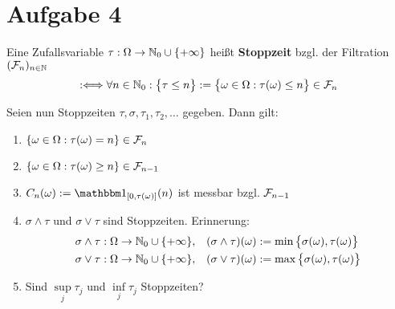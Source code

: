 \documentclass[12pt,a4paper]{article}
\begin{document}
\section*{Aufgabe 4}
\begin{defi}
Eine Zufallsvariable $\tau:\Omega\to\mathbb{N}_0\cup\lbrace+\infty\rbrace$ heißt \textbf{Stoppzeit} bzgl. der Filtration $(\mathcal{F}_n)_{n\in\mathbb{N}}$
\begin{align*}
:\Longleftrightarrow\forall n\in\mathbb{N}_0:\big\lbrace\tau\leq n\big\rbrace:=\big\lbrace \omega\in\Omega:\tau(\omega)\leq n\big\rbrace\in\mathcal{F}_n
\end{align*}
\end{defi}
Seien nun Stoppzeiten $\tau,\sigma,\tau_1,\tau_2,\ldots$ gegeben. Dann gilt:
\begin{enumerate}[label=\alph*)]
\item $\lbrace\omega\in\Omega:\tau(\omega)=n\rbrace\in\mathcal{F}_n$
\item $\lbrace\omega\in\Omega:\tau(\omega)\geq n\rbrace\in\mathcal{F}_{n-1}$
\item $\begin{aligned}
C_n(\omega):=\indi_{[0,\tau(\omega)]}(n)
\end{aligned}$ ist messbar bzgl. $\mathcal{F}_{n-1}$
\item $\sigma\wedge\tau$ und $\sigma\vee\tau$ sind Stoppzeiten. Erinnerung:
\begin{align*}
&\sigma\wedge\tau:\Omega\to\mathbb{N}_0\cup\lbrace+\infty\rbrace,&(\sigma\wedge\tau)(\omega)&:=\min\big\lbrace\sigma(\omega),\tau(\omega)\big\rbrace\\
&\sigma\vee\tau:\Omega\to\mathbb{N}_0\cup\lbrace+\infty\rbrace,&(\sigma\vee\tau)(\omega)&:=\max\big\lbrace\sigma(\omega),\tau(\omega)\big\rbrace
\end{align*}
\item Sind $\sup\limits_j\tau_j$ und $\inf\limits_j\tau_j$ Stoppzeiten?
\end{enumerate}
\end{document}
